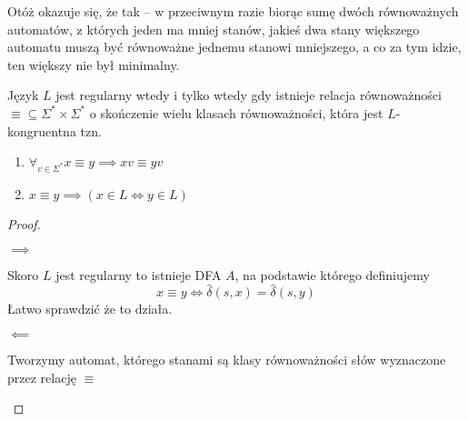 Otóż okazuje się, że tak -- w przeciwnym razie biorąc sumę dwóch równoważnych automatów, z których jeden ma mniej stanów, jakieś dwa stany większego automatu muszą być równoważne jednemu stanowi mniejszego, a co za tym idzie, ten większy nie był minimalny.

\begin{theorem}
	Język \( L \) jest regularny wtedy i tylko wtedy gdy
	istnieje relacja równoważności \( \equiv \subseteq \Sigma^* \times \Sigma^*\) o skończenie wielu klasach równoważności, która jest \(L\)-kongruentna tzn.
	\begin{enumerate}
		\item \(\forall_{v \in \Sigma^*} x \equiv y \implies xv \equiv yv \)
		\item \( x \equiv y \implies (x \in L \iff y \in L)\)
	\end{enumerate}
\end{theorem}
\begin{proof} \( \)
	\begin{description}
		\item \( \implies \)

		      Skoro \( L \) jest regularny to istnieje DFA \( A \), na podstawie którego definiujemy
		      \[
			      x \equiv y \iff \hat \delta(s, x) = \hat \delta(s, y)
		      \]
		      Łatwo sprawdzić że to działa.

		\item \( \impliedby \)

		      Tworzymy automat, którego stanami są klasy równoważności słów wyznaczone przez relację \( \equiv \)
	\end{description}
\end{proof}